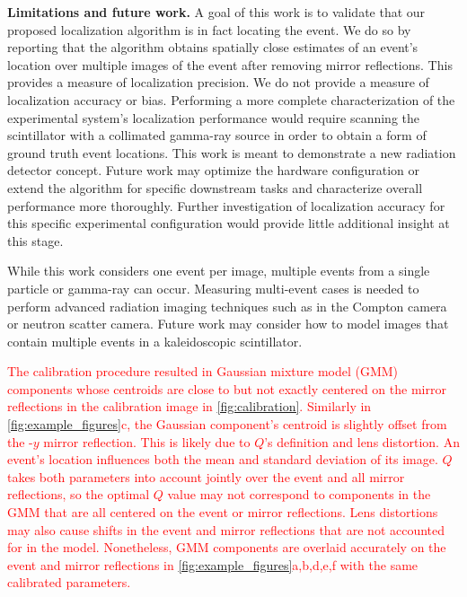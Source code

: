 \noindent
\textbf{Limitations and future work.}
A goal of this work is to validate that our proposed localization algorithm is in 
fact locating the event.
We do so by reporting that the algorithm obtains spatially close estimates of an 
event's location over multiple images of the event after removing mirror reflections.
This provides a measure of localization precision.
We do not provide a measure of localization accuracy or bias.
Performing a more complete characterization of the experimental system's 
localization performance would require scanning the scintillator with a collimated 
gamma-ray source in order to obtain a form of ground truth event locations.
This work is meant to demonstrate a new radiation detector concept.
Future work may optimize the hardware configuration or extend the algorithm for 
specific downstream tasks and characterize overall performance more thoroughly.
Further investigation of localization accuracy for this specific experimental 
configuration would provide little additional insight at this stage.

While this work considers one event per image, multiple events from a single 
particle or gamma-ray can occur. 
Measuring multi-event cases is needed to perform advanced radiation imaging 
techniques such as in the Compton camera or neutron scatter camera.
Future work may consider how to model images that contain multiple events in a 
kaleidoscopic scintillator.

\textcolor{red}{The calibration procedure resulted in Gaussian mixture model (GMM) components 
whose centroids are close to but not exactly centered on the mirror reflections in 
the calibration image in \cref{fig:calibration}.
Similarly in \cref{fig:example_figures}c, the Gaussian component's centroid is 
slightly offset from the -$y$ mirror reflection.
This is likely due to $Q$'s definition and lens distortion.
An event's location influences both the mean and standard deviation of its image.
$Q$ takes both parameters into account jointly over the event and all mirror 
reflections, so the optimal $Q$ value may not correspond to components in the GMM 
that are all centered on the event or mirror reflections.
Lens distortions may also cause shifts in the event and mirror reflections that 
are not accounted for in the model.
Nonetheless, GMM components are overlaid accurately on the event and mirror 
reflections in \cref{fig:example_figures}a,b,d,e,f with the same calibrated parameters.}

